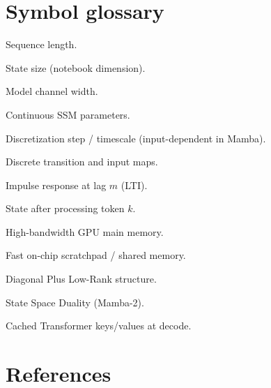 \documentclass[11pt,a4paper]{article}
\begin{document}
\section{Symbol glossary}

\begin{description}[style=nextline,leftmargin=2.6cm,font=\normalfont\bfseries]
  \item[$L$] Sequence length.
  \item[$N$] State size (notebook dimension).
  \item[$d$ / $D$] Model channel width.
  \item[$A,B,C,D$] Continuous SSM parameters.
  \item[$\Delta$] Discretization step / timescale (input-dependent in Mamba).
  \item[$\bar A,\bar B$] Discrete transition and input maps.
  \item[$K_m$] Impulse response at lag $m$ (LTI).
  \item[$x_k$] State after processing token $k$.
  \item[HBM] High-bandwidth GPU main memory.
  \item[SRAM] Fast on-chip scratchpad / shared memory.
  \item[DPLR] Diagonal Plus Low-Rank structure.
  \item[SSD] State Space Duality (Mamba-2).
  \item[KV-cache] Cached Transformer keys/values at decode.
\end{description}

\section{References}
\end{document}
